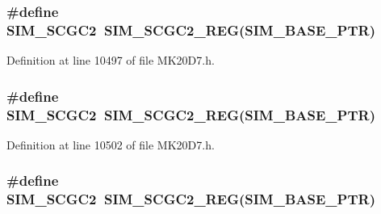 \subsubsection[{\texorpdfstring{S\+I\+M\+\_\+\+S\+C\+G\+C2}{SIM_SCGC2}}]{\setlength{\rightskip}{0pt plus 5cm}\#define S\+I\+M\+\_\+\+S\+C\+G\+C2~{\bf S\+I\+M\+\_\+\+S\+C\+G\+C2\+\_\+\+R\+EG}({\bf S\+I\+M\+\_\+\+B\+A\+S\+E\+\_\+\+P\+TR})}\hypertarget{group___s_i_m___register___accessor___macros_gada34776c821222335f533e61e0b269ac}{}\label{group___s_i_m___register___accessor___macros_gada34776c821222335f533e61e0b269ac}


Definition at line 10497 of file M\+K20\+D7.\+h.

\subsubsection[{\texorpdfstring{S\+I\+M\+\_\+\+S\+C\+G\+C2}{SIM_SCGC2}}]{\setlength{\rightskip}{0pt plus 5cm}\#define S\+I\+M\+\_\+\+S\+C\+G\+C2~{\bf S\+I\+M\+\_\+\+S\+C\+G\+C2\+\_\+\+R\+EG}({\bf S\+I\+M\+\_\+\+B\+A\+S\+E\+\_\+\+P\+TR})}\hypertarget{group___s_i_m___register___accessor___macros_gada34776c821222335f533e61e0b269ac}{}\label{group___s_i_m___register___accessor___macros_gada34776c821222335f533e61e0b269ac}


Definition at line 10502 of file M\+K20\+D7.\+h.

\subsubsection[{\texorpdfstring{S\+I\+M\+\_\+\+S\+C\+G\+C2}{SIM_SCGC2}}]{\setlength{\rightskip}{0pt plus 5cm}\#define S\+I\+M\+\_\+\+S\+C\+G\+C2~{\bf S\+I\+M\+\_\+\+S\+C\+G\+C2\+\_\+\+R\+EG}({\bf S\+I\+M\+\_\+\+B\+A\+S\+E\+\_\+\+P\+TR})}\hypertarget{group___s_i_m___register___accessor___macros_gada34776c821222335f533e61e0b269ac}{}\label{group___s_i_m___register___accessor___macros_gada34776c821222335f533e61e0b269ac}


